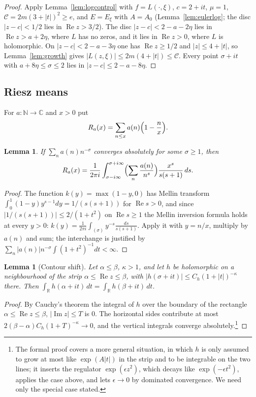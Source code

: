 \documentclass[11pt]{amsart}
\newtheorem{lemma}[theorem]{Lemma}
\theoremstyle{definition}
\theoremstyle{remark}
\numberwithin{equation}{section}
\newcommand{\R}{\operatorname{Re}}
\newcommand{\I}{\operatorname{Im}}
\newcommand{\e}{e}
\begin{document}
\begin{proof}
Apply Lemma~\ref{lem:logcontrol} with $f=L(\cdot,\xi)$, $c=2+it$, $\mu=1$,
$\mathcal C=2m(3+|t|)^2\ge\e$, and $E=E_\xi$ with $A=A_0$
(Lemma~\ref{lem:eulerlog}; the disc $|z-c|<1/2$ lies in $\R z>3/2$). The disc
$|z-c|<2-a-2\eta$ lies in $\R z>a+2\eta$, where $L$ has no zeros, and it lies in
$\R z>0$, where $L$ is holomorphic. On $|z-c|<2-a-3\eta$ one has $\R z\ge1/2$ and
$|z|\le4+|t|$, so Lemma~\ref{lem:growth} gives $|L(z,\xi)|\le2m(4+|t|)\le\mathcal C$.
Every point $\sigma+it$ with $a+8\eta\le\sigma\le2$ lies in $|z-c|\le2-a-8\eta$.
\end{proof}

\subsection{Riesz means}

For $a:\mathbb N\to\mathbb C$ and $x>0$ put
\[
R_a(x)=\sum_{n\le x}a(n)\Bigl(1-\frac nx\Bigr).
\]

\begin{lemma}\label{lem:riesz}
If $\sum_na(n)n^{-\sigma}$ converges absolutely for some $\sigma\ge1$, then
\[
R_a(x)=\frac1{2\pi i}\int_{\sigma-i\infty}^{\sigma+i\infty}\Bigl(\sum_n\frac{a(n)}{n^s}\Bigr)\frac{x^s}{s(s+1)}\,ds .
\]
\end{lemma}

\begin{proof}
The function $k(y)=\max(1-y,0)$ has Mellin transform $\int_0^1(1-y)y^{s-1}dy=1/(s(s+1))$
for $\R s>0$, and since $|1/(s(s+1))|\le2/(1+t^2)$ on $\R s\ge1$ the Mellin
inversion formula holds at every $y>0$: $k(y)=\frac1{2\pi i}\int_{(\sigma)}y^{-s}\frac{ds}{s(s+1)}$.
Apply it with $y=n/x$, multiply by $a(n)$ and sum; the interchange is justified
by $\sum_n|a(n)|n^{-\sigma}\int(1+t^2)^{-1}dt<\infty$.
\end{proof}

\begin{lemma}[Contour shift]\label{lem:shift}
Let $\alpha\le\beta$, $\kappa>1$, and let $h$ be holomorphic on a neighbourhood of the strip
$\alpha\le\R z\le\beta$, with $|h(\sigma+it)|\le C_h(1+|t|)^{-\kappa}$ there. Then
$\int_{\mathbb R}h(\alpha+it)\,dt=\int_{\mathbb R}h(\beta+it)\,dt$.
\end{lemma}

\begin{proof}
By Cauchy's theorem the integral of $h$ over the boundary of the rectangle
$\alpha\le\R z\le\beta$, $|\I z|\le T$ is $0$. The horizontal sides contribute at
most $2(\beta-\alpha)C_h(1+T)^{-\kappa}\to0$, and the vertical integrals converge
absolutely.\footnote{The formal proof covers a more general situation, in
which $h$ is only assumed to grow at most like $\exp(A|t|)$ in the strip and to
be integrable on the two lines; it inserts the regulator $\exp(\epsilon z^2)$,
which decays like $\exp(-\epsilon t^2)$, applies the case above, and lets
$\epsilon\to0$ by dominated convergence. We need only the special case stated.}
\end{proof}
\end{document}
